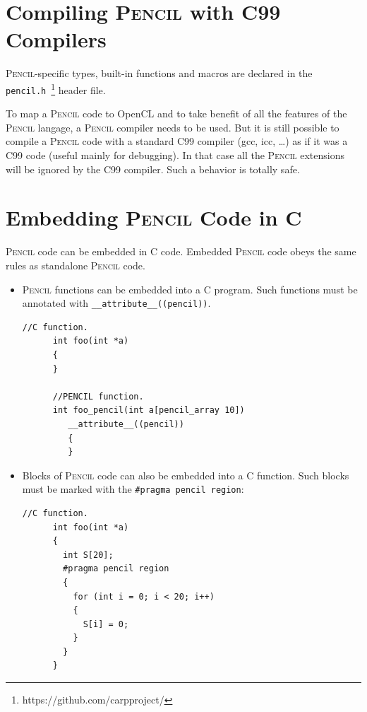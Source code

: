 \documentclass{carp}
\newcommand\pencil{\textsc{Pencil}\xspace}
\begin{document}
\section{Compiling \pencil with C99 Compilers}

\pencil-specific types, built-in functions and macros are declared in
the \texttt{pencil.h}~\footnote{https://github.com/carpproject/}
header file.

To map a \pencil code to OpenCL and to take benefit of all the features
of the \pencil langage, a \pencil compiler needs to be used.
But it is still possible to compile a \pencil code with a standard C99
compiler (gcc, icc, \dots) as if it was a C99 code (useful mainly for
debugging).
In that case all the \pencil extensions will be ignored by the C99
compiler.  Such a behavior is totally safe.


\section{Embedding \pencil Code in C}
\label{sec:pencil-as-c-ext}

\pencil code can be embedded in C code.
Embedded \pencil code obeys the same rules as standalone \pencil code.

\begin{itemize}
  \item \pencil functions can be embedded into a C program.
    Such functions must be annotated with \lstinline!__attribute__((pencil))!.
    \begin{lstlisting}[language=pencil]
      //C function.
      int foo(int *a)
      {
      }

      //PENCIL function.
      int foo_pencil(int a[pencil_array 10])
         __attribute__((pencil))
         {
         }
       \end{lstlisting}

  \item Blocks of \pencil code can also be embedded into a C function.
    Such blocks must be marked with the \lstinline!#pragma pencil region!:
    \begin{lstlisting}[language=pencil]
      //C function.
      int foo(int *a)
      {
        int S[20];
        #pragma pencil region
        {
          for (int i = 0; i < 20; i++)
          {
            S[i] = 0;
          }
        }
      }
    \end{lstlisting}
\end{itemize}
\end{document}
